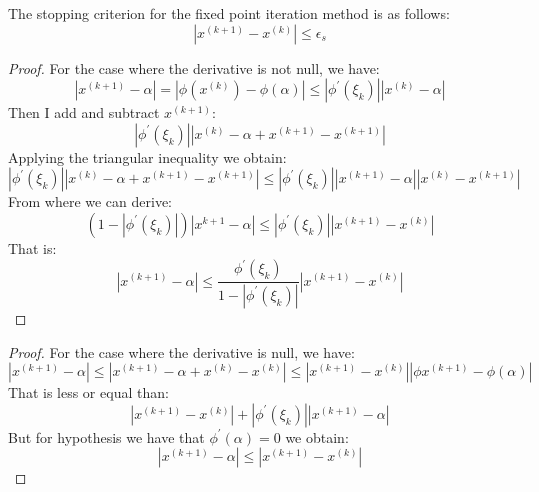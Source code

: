 \documentclass[12pt, a4paper]{report}
\begin{document}
    The stopping criterion for the fixed point iteration method is as follows:
    \[\left\lvert x^{(k+1)}-x^{(k)} \right\rvert \leq \epsilon_s\]
    \begin{proof}
        For the case where the derivative is not null, we have: 
        \[\left\lvert x^{(k+1)} - \alpha \right\rvert = \left\lvert \phi(x^{(k)}) - \phi(\alpha) \right\rvert \leq \left\lvert \phi^{'}(\xi_k)\right\rvert \left\lvert x^{(k)} - \alpha\right\rvert \]
        Then I add and subtract $x^{(k+1)}$: 
        \[\left\lvert \phi^{'}(\xi_k)\right\rvert \left\lvert x^{(k)}-\alpha + x^{(k+1)} - x^{(k+1)}\right\rvert\]
        Applying the triangular inequality we obtain: 
        \[\left\lvert \phi^{'}(\xi_k)\right\rvert\left\lvert x^{(k)}-\alpha+x^{(k+1)}-x^{(k+1)}\right\rvert\leq\left\lvert\phi^{'}(\xi_k)\right\rvert\left\lvert x^{(k+1)}-\alpha \right\rvert\left\lvert x^{(k)}-x^{(k+1)}\right\rvert\]
        From where we can derive: 
        \[\left(1-\left\lvert\phi^{'}(\xi_k)\right\rvert\right)\left\lvert x^{k+1}-\alpha\right\rvert\leq\left\lvert\phi^{'}(\xi_k)\right\rvert\left\lvert x^{(k+1)}-x^{(k)}\right\rvert\]
        That is: 
        \[\left\lvert x^{(k+1)}-\alpha\right\rvert\leq\dfrac{\phi^{'}(\xi_k)}{1-\left\lvert\phi^{'}(\xi_k)\right\rvert}\left\lvert x^{(k+1)}-x^{(k)}\right\rvert\]
    \end{proof}
    \begin{proof}
        For the case where the derivative is null, we have: 
        \[\left\lvert x^{(k+1)}-\alpha\right\rvert\leq\left\lvert x^{(k+1)}-\alpha+x^{(k)}-x^{(k)}\right\rvert\leq\left\lvert x^{(k+1)}-x^{(k)}\right\rvert\left\lvert\phi{x^{(k+1)}}-\phi(\alpha)\right\rvert\]
        That is less or equal than:
        \[\left\lvert x^{(k+1)}-x^{(k)}\right\rvert+\left\lvert\phi^{'}(\xi_k)\right\rvert\left\lvert x^{(k+1)}-\alpha\right\rvert\]
        But for hypothesis we have that $\phi^{'}(\alpha)=0$ we obtain: 
        \[\left\lvert x^{(k+1)}-\alpha\right\rvert\leq\left\lvert x^{(k+1)}-x^{(k)}\right\rvert\]
    \end{proof}
\end{document}
